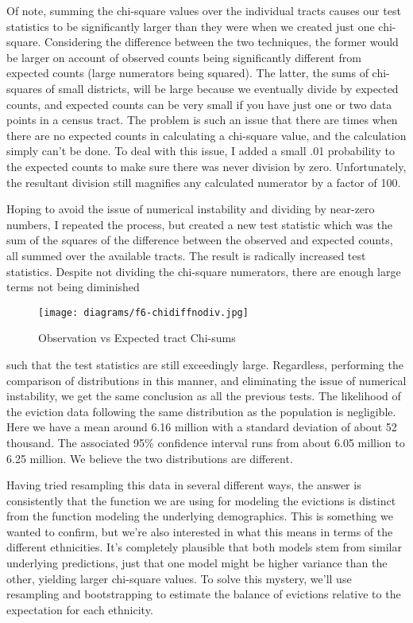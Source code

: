 \par Of note, summing the chi-square values over the individual tracts causes our test statistics to be significantly larger than they were when we created just one chi-square.  Considering the difference between the two techniques, the former would be larger on account of observed counts being significantly different from expected counts (large numerators being squared).  The latter, the sums of chi-squares of small districts, will be large because we eventually divide by expected counts, and expected counts can be very small if you have just one or two data points in a census tract.  The problem is such an issue that there are times when there are no expected counts in calculating a chi-square value, and the calculation simply can’t be done.  To deal with this issue, I added a small .01 probability to the expected counts to make sure there was never division by zero.  Unfortunately, the resultant division still magnifies any calculated numerator by a factor of 100.



\par Hoping to avoid the issue of numerical instability and dividing by near-zero numbers, I repeated the process, but created a new test statistic which was the sum of the squares of the difference between the observed and expected counts, all summed over the available tracts.  The result is radically increased test statistics.  Despite not dividing the chi-square numerators, there are enough large terms not being diminished 

\begin{wrapfigure}{r}{2in}
\texttt{[image: diagrams/f6-chidiffnodiv.jpg]}
\caption{Observation vs Expected tract Chi-sums}
\label{fig:figure6}
\end{wrapfigure}

\setlength{\parindent}{0cm} such that the test statistics are still exceedingly large.  Regardless, performing the comparison of distributions in this manner, and eliminating the issue of numerical instability, we get the same conclusion as all the previous tests.  The likelihood of the eviction data following the same distribution as the population is negligible.  Here we have a mean around 6.16 million with a standard deviation of about 52 thousand.  The associated 95\% confidence interval runs from about 6.05 million to 6.25 million.  We believe the two distributions are different.

\setlength{\parindent}{.5cm}
\par Having tried resampling this data in several different ways, the answer is consistently that the function we are using for modeling the evictions is distinct from the function modeling the underlying demographics.  This is something we wanted to confirm, but we’re also interested in what this means in terms of the different ethnicities.  It’s completely plausible that both models stem from similar underlying predictions, just that one model might be higher variance than the other, yielding larger chi-square values.  To solve this mystery, we’ll use resampling and bootstrapping to estimate the balance of evictions relative to the expectation for each ethnicity.

